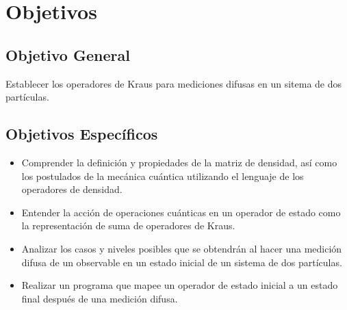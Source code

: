 \section{Objetivos}

\subsection{Objetivo General}

Establecer los operadores de Kraus para mediciones difusas en un sitema de dos partículas. 


\subsection{Objetivos Específicos}
\begin{itemize}
	\item Comprender la definición y propiedades de la matriz de densidad, así como los postulados de la mecánica cuántica utilizando el lenguaje de los operadores de densidad.
	
	\item Entender la acción de operaciones cuánticas en un operador de estado como la representación de suma de operadores de Kraus. 

	\item Analizar los casos y niveles posibles que se obtendrán al hacer una medición difusa de un observable en un estado inicial de un sistema de dos partículas.
	
	\item Realizar un programa que mapee un operador de estado inicial a un estado final después de una medición difusa.

	
	
\end{itemize}